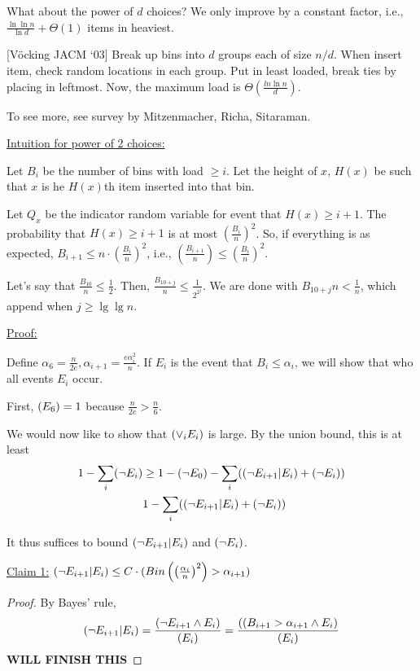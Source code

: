 \documentclass[11pt]{article}
\let\Pr\relax
\DeclareMathOperator*{\Pr}{\mathbb{P}}
\begin{document}
What about the power of $d$ choices? We only improve by a constant factor, i.e., $\frac{\ln\ln n}{\ln d} + \Theta(1)$
items in heaviest.

[V\"{o}cking JACM `03] Break up bins into $d$ groups each of size $n/d$. When insert item, check random
locations in each group. Put in least loaded, break ties by placing in leftmost. Now, the maximum load is
$\Theta\left(\frac{ln\ln n}{d}\right)$.

To see more, see survey by Mitzenmacher, Richa, Sitaraman.

\underline{Intuition for power of 2 choices:}

Let $B_i$ be the number of bins with load $\geq i$. Let the height of $x$, $H(x)$ be such that $x$ is he
$H(x)$th item inserted into that bin.

Let $Q_x$ be the indicator random variable for event that $H(x) \geq i + 1$. The probability that
$H(x) \geq i + 1$ is at most $\left(\frac{B_i}{n}\right)^2$. So, if everything is as expected,
$B_{i+1} \leq n \cdot \left(\frac{B_i}{n}\right)^2$, i.e., $\left(\frac{B_{i+1}}{n}\right) \leq \left(\frac{B_i}{n}\right)^2$.

Let's say that $\frac{B_{10}}{n} \leq \frac{1}{2}$. Then, $\frac{B_{10 + j}}{n} \leq \frac{1}{2^{2^j}}$. We
are done with $B_{10 + j}{n} < \frac{1}{n}$, which append when $j \geq \lg \lg n$.

\underline{Proof:}

Define $\alpha_6 = \frac{n}{2e}, \alpha_{i+1} = \frac{e \alpha_i^2}{n}$. If $E_i$ is the event that $B_i \leq \alpha_i$,
we will show that who all events $E_i$ occur.

First, $\Pr(E_6) = 1$ because $\frac{n}{2e} > \frac{n}{6}$.

We would now like to show that $\Pr(\vee_i E_i)$ is large. By the union bound, this is at least 
\begin{align*}
1 - \sum_i \Pr(\neg E_i) &\ge 1 - \Pr(\neg E_0) - \sum_i (\Pr(\neg E_{i+1}|E_i) + \Pr(\neg E_i))\\
{}& 1 -  \sum_i (\Pr(\neg E_{i+1}|E_i) + \Pr(\neg E_i))
\end{align*}

It thus suffices to bound $\Pr(\neg E_{i+1} | E_i)$ and $\Pr(\neg E_i)$.

\underline{Claim 1:} $\Pr(\neg E_{i+1} | E_i) \leq C \cdot \Pr(Bin\left(\left(\frac{\alpha_i}{n}\right)^2\right) > \alpha_{i+1})$
\begin{proof}
By Bayes' rule,
$$
\Pr(\neg E_{i+1} | E_i) = \frac{\Pr(\neg E_{i+1}\wedge E_i)}{\Pr(E_i)} = \frac{\Pr((B_{i+1} > \alpha_{i+1} \wedge E_i) }{\Pr(E_i)}
$$
\textbf{WILL FINISH THIS}
\end{proof}
\end{document}
